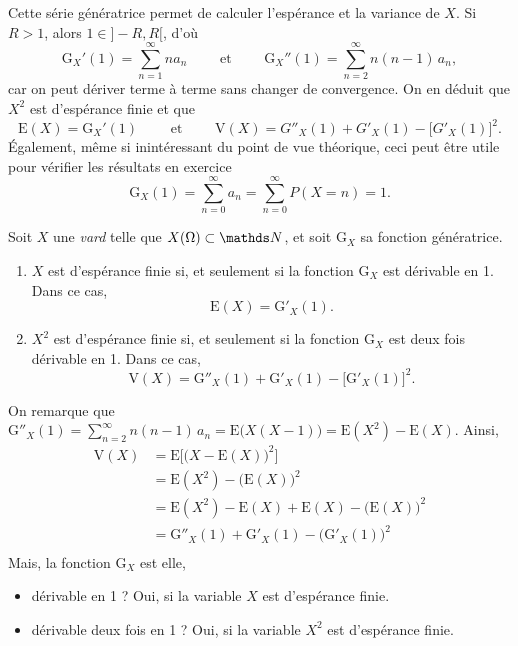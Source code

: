 Cette série génératrice permet de calculer l'espérance et la variance de $X$. Si $R > 1$, alors $1 \in {]-R,R[}$, d'où \[
  \mathrm{G}_X'(1) = \sum_{n=1}^\infty n a_n \quad\quad \text{ et }\quad\quad
  \mathrm{G}_X''(1) = \sum_{n=2}^\infty n(n-1)\,a_n
,\] car on peut dériver terme à terme sans changer de convergence.
On en déduit que $X^2$\/ est d'espérance finie et que \[
  \mathrm{E}(X) = \mathrm{G}_X'(1) \quad\quad \text{ et }\quad\quad
  \mathrm{V}(X) = G''_X(1) + G'_X(1) - \big[G'_X(1)\big]^2
.\]
Également, même si inintéressant du point de vue théorique, ceci peut être utile pour vérifier les résultats en exercice \[
  \mathrm{G}_X(1) = \sum_{n=0}^\infty a_n = \sum_{n=0}^\infty P(X = n) = 1
.\]

\begin{prop}
  Soit $X$\/ une \textit{vard} telle que $X(\Omega) \subset \N$, et soit $\mathrm{G}_X$\/ sa fonction génératrice.
  \begin{enumerate}
    \item $X$\/ est d'espérance finie si, et seulement si la fonction $\mathrm{G}_X$\/ est dérivable en 1. Dans ce cas, \[
        \mathrm{E}(X) = \mathrm{G}'_X(1)
      .\]
    \item $X^2$\/ est d'espérance finie si, et seulement si la fonction $\mathrm{G}_X$\/ est deux fois dérivable en 1. Dans ce cas, \[
        \mathrm{V}(X) = \mathrm{G}''_X(1) + \mathrm{G}'_X(1) - \big[\mathrm{G}'_X(1)\big]^2
      .\] 
  \end{enumerate}
\end{prop}

\begin{prv}
  On remarque que $\mathrm{G}''_X(1) = \sum_{n=2}^\infty n(n-1)\,a_n = \mathrm{E}\big(X(X-1)\big) = \mathrm{E}(X^2) - \mathrm{E}(X)$.
  Ainsi,
  \begin{align*}
    \mathrm{V}(X) &= \mathrm{E}\Big[\big(X - \mathrm{E}(X)\big)^2\Big] \\
    &= \mathrm{E}(X^2) - \big(\mathrm{E}(X)\big)^2 \\
    &= \mathrm{E}(X^2) - \mathrm{E}(X) + \mathrm{E}(X) - \big(\mathrm{E}(X)\big)^2 \\
    &= \mathrm{G}''_X(1) + \mathrm{G}'_X(1) - \big(\mathrm{G}'_X(1)\big)^2 \\
  \end{align*}
  Mais, la fonction $\mathrm{G}_X$\/ est elle,
  \begin{itemize}
    \item dérivable en 1 ? Oui, si la variable $X$\/ est d'espérance finie.
    \item dérivable deux fois en 1 ? Oui, si la variable $X^2$\/ est d'espérance finie.
  \end{itemize}
\end{prv}

